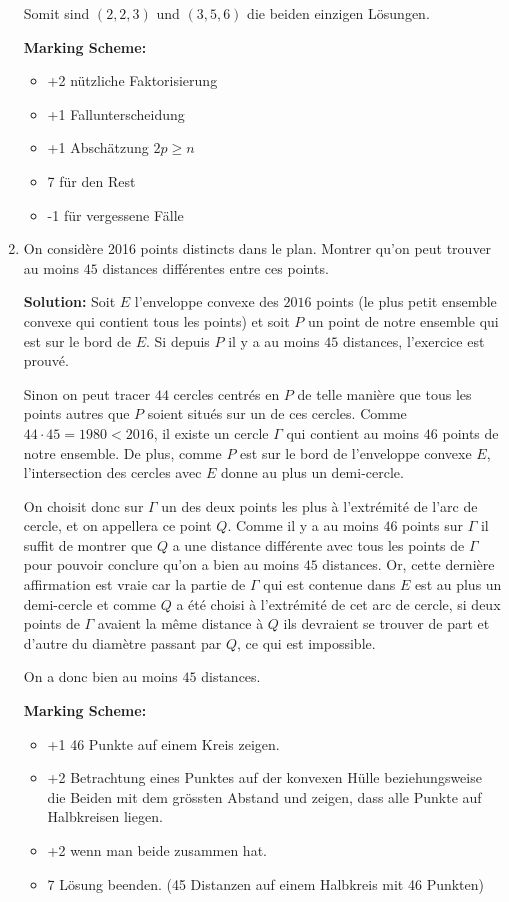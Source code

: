 \documentclass[language=german,style=solution]{smo}
\begin{document}
\begin{enumerate}[label=\textbf{\arabic*.}]
Somit sind $(2,2,3)$ und $(3,5,6)$ die beiden einzigen Lösungen.

\textbf{Marking Scheme:}
\begin{itemize}
\item +2 nützliche Faktorisierung
\item +1 Fallunterscheidung
\item +1 Abschätzung $2p \geq n$
\item 7 für den Rest
\item -1 für vergessene Fälle
\end{itemize}

\newpage

\item On considère 2016 points distincts dans le plan. Montrer qu'on peut trouver au moins $45$ distances différentes entre ces points.

\textbf{Solution:} 	Soit $E$ l'enveloppe convexe des $2016$ points (le plus petit ensemble convexe qui contient tous les points) et soit $P$ un point de notre ensemble qui est sur le bord de $E$. Si depuis $P$ il y a au moins $45$ distances, l'exercice est prouvé.
	
	Sinon on peut tracer $44$ cercles centrés en $P$ de telle manière que tous les points autres que $P$ soient situés sur un de ces cercles. Comme $44\cdot 45 = 1980 < 2016$, il existe un cercle $\Gamma$ qui contient au moins $46$ points de notre ensemble. De plus, comme $P$ est sur le bord de l'enveloppe convexe $E$, l'intersection des cercles avec $E$ donne au plus un demi-cercle.
	
	On choisit donc sur $\Gamma$ un des deux points les plus à l'extrémité de l'arc de cercle, et on appellera ce point $Q$. Comme il y a au moins $46$ points sur $\Gamma$ il suffit de montrer que $Q$ a une distance différente avec tous les points de $\Gamma$ pour pouvoir conclure qu'on a bien au moins $45$ distances. Or, cette dernière affirmation est vraie car la partie de $\Gamma$ qui est contenue dans $E$ est au plus un demi-cercle et comme $Q$ a été choisi à l'extrémité de cet arc de cercle, si deux points de $\Gamma$ avaient la même distance à $Q$ ils devraient se trouver de part et d'autre du diamètre passant par $Q$, ce qui est impossible.
	
	On a donc bien au moins $45$ distances.
	
\textbf{Marking Scheme:}
\begin{itemize}
\item +1 46 Punkte auf einem Kreis zeigen.
\item +2 Betrachtung eines Punktes auf der konvexen Hülle beziehungsweise die Beiden mit dem grössten Abstand und zeigen, dass alle Punkte auf Halbkreisen liegen.
\item +2 wenn man beide zusammen hat.
\item 7 Lösung beenden. (45 Distanzen auf einem Halbkreis mit 46 Punkten)
\end{itemize}


\end{enumerate}
\end{document}
